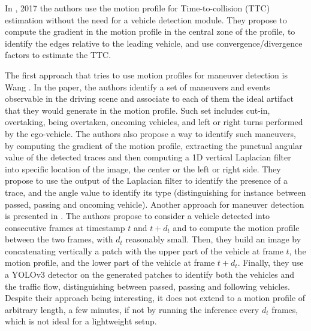 In \kilicarslan {}, 2017 \cite{kilicarslan2016bridge, kilicarslan2017direct} the authors use the motion profile for Time-to-collision (TTC) estimation without the need for a vehicle detection module. They propose to compute the gradient in the motion profile in the central zone of the profile, to identify the edges relative to the leading vehicle, and use convergence/divergence factors to estimate the TTC.

The first approach that tries to use motion profiles for maneuver detection is Wang \etal \cite{wang2020detecting}. 
In the paper, the authors identify a set of maneuvers and events observable in the driving scene and associate to each of them the ideal artifact that they would generate in the motion profile.
Such set includes cut-in, overtaking, being overtaken, oncoming vehicles, and left or right turns performed by the ego-vehicle.
The authors also propose a way to identify such maneuvers, by computing the gradient of the motion profile, extracting the punctual angular value of the detected traces and then computing a 1D vertical Laplacian filter into specific location of the image, \eg the center or the left or right side.
They propose to use the output of the Laplacian filter to identify the presence of a trace, and the angle value to identify its type (distinguishing for instance between passed, passing and oncoming vehicle).
Another approach for maneuver detection is presented in \kilicarslan {} \cite{kilicarslan2022motion}.
The authors propose to consider a vehicle detected into consecutive frames at timestamp $t$ and $t + d_t$ and to compute the motion profile between the two frames, with $d_t$ reasonably small. Then, they build an image by concatenating vertically a patch with the upper part of the vehicle at frame $t$, the motion profile, and the lower part of the vehicle at frame $t + d_t$.
Finally, they use a YOLOv3 detector on the generated patches to identify both the vehicles and the traffic flow, \ie distinguishing between passed, passing and following vehicles.
Despite their approach being interesting, it does not extend to a motion profile of arbitrary length, \eg a few minutes, if not by running the inference every $d_t$ frames, which is not ideal for a lightweight setup.